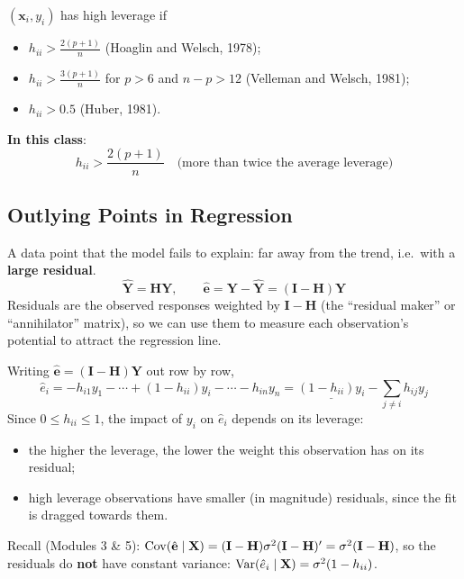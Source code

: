 \begin{definition}
    $(\mathbf{x}_i,y_i)$ has high leverage if
    \begin{itemize}
        \item $h_{ii}>\frac{2(p+1)}{n}$ (Hoaglin and Welsch, 1978);
        \item $h_{ii}>\frac{3(p+1)}{n}$ for $p>6$ and $n-p>12$ (Velleman and Welsch, 1981);
        \item $h_{ii}>0.5$ (Huber, 1981).
    \end{itemize}
    \textbf{In this class}: \[\boxed{h_{ii}>\frac{2(p+1)}{n}}\quad\text{(more than twice the average leverage)}\]
\end{definition}

\subsection{Outlying Points in Regression}

\begin{definition}
    A data point that the model fails to explain: far away from the trend, i.e.\ with a
    \textbf{large residual}.
    \[\hat{\mathbf{Y}}=\mathbf{H}\mathbf{Y},\qquad \hat{\mathbf{e}}=\mathbf{Y}-\hat{\mathbf{Y}}=(\mathbf{I}-\mathbf{H})\mathbf{Y}\]
    Residuals are the observed responses weighted by $\mathbf{I}-\mathbf{H}$ (the ``residual
    maker'' or ``annihilator'' matrix), so we can use them to measure each observation's
    potential to attract the regression line.
\end{definition}

\begin{proposition}
    Writing $\hat{\mathbf{e}}=(\mathbf{I}-\mathbf{H})\mathbf{Y}$ out row by row,
    \[\hat e_i=-h_{i1}y_1-\cdots+(1-h_{ii})y_i-\cdots-h_{in}y_n=\underline{(1-h_{ii})y_i}-\sum_{j\neq i}h_{ij}y_j\]
    Since $0\leq h_{ii}\leq1$, the impact of $y_i$ on $\hat e_i$ depends on its leverage:
    \begin{itemize}
        \item the higher the leverage, the lower the weight this observation has on its residual;
        \item high leverage observations have smaller (in magnitude) residuals, since the fit is
        dragged towards them.
    \end{itemize}
    Recall (Modules 3 \& 5):
    $\operatorname{Cov}(\hat{\mathbf{e}}\mid\mathbf{X})=(\mathbf{I}-\mathbf{H})\sigma^2(\mathbf{I}-\mathbf{H})'=\sigma^2(\mathbf{I}-\mathbf{H})$,
    so the residuals do \textbf{not} have constant variance: $\operatorname{Var}(\hat e_i\mid\mathbf{X})=\sigma^2(1-h_{ii})$.
\end{proposition}

